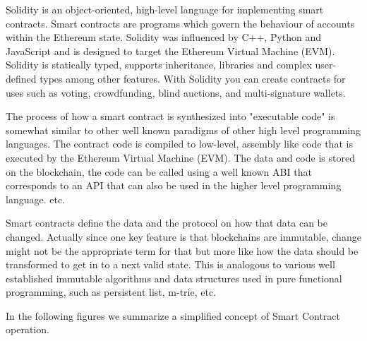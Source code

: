 \documentclass[a4paper]{article}
\begin{document}
Solidity is an object-oriented, high-level language for implementing smart contracts. Smart contracts are programs which govern the behaviour of accounts within the Ethereum state. Solidity was influenced by C++, Python and JavaScript and is designed to target the Ethereum Virtual Machine (EVM).
Solidity is statically typed, supports inheritance, libraries and complex user-defined types among other features. With Solidity you can create contracts for uses such as voting, crowdfunding, blind auctions, and multi-signature wallets.\cite{solidity_manual}

The process of how a smart contract is synthesized into "executable code" is somewhat similar to other well known paradigms of other high level programming languages. The contract code is compiled to low-level, assembly like code that is executed by the Ethereum Virtual Machine (EVM). The data and code is stored on the blockchain, the code can be called using a well known ABI that corresponds to an API that can also be used in the higher level programming language. etc.

Smart contracts define the data and the protocol on how that data can be changed. Actually since one key feature is that blockchains are immutable, change might not be the appropriate term for that but more like how the data should be transformed to get in to a next valid state. This is analogous to various well established immutable algorithms and data structures used in pure functional programming, such as persistent list, m-trie, etc. 



In the following figures we summarize a simplified concept of Smart Contract operation.
\end{document}
